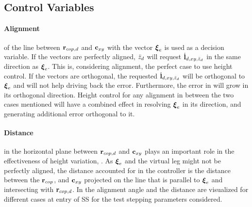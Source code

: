 \subsection{Control Variables}\label{sec:strategy}

%
\paragraph{Alignment} of the line between $\mathbf{r}_{cop,d}$ and $\mathbf{c}_{xy}$ with the vector $\boldsymbol{\xi}_e$ is used as a decision variable. If the vectors are perfectly aligned, $\ddot{z}_d$ will request $\dot{\mathbf{l}}_{d,xy,\ddot{z}_d}$ in the same direction as $\boldsymbol{\xi}_e$. This is, considering alignment, the perfect case to use height control. If the vectors are orthogonal, the requested $\dot{\mathbf{l}}_{d,xy,\ddot{z}_d}$ will be orthogonal to $\boldsymbol{\xi}_e$ and will not help driving back the error. Furthermore, the error in will grow in its orthogonal direction. Height control for any alignment in between the two cases mentioned will have a combined effect in resolving $\boldsymbol{\xi}_e$ in its direction, and generating additional error orthogonal to it.

\paragraph{Distance} in the horizontal plane between $\mathbf{r}_{cop,d}$ and $\mathbf{c}_{xy}$ plays an important role in the effectiveness of height variation, . As $\boldsymbol{\xi}_e$ and the virtual leg might not be perfectly aligned, the distance accounted for in the controller is the distance between the $\mathbf{r}_{cop}$, and $\mathbf{c}_{xy}$ projected on the line that is parallel to $\boldsymbol{\xi}_e$ and intersecting with $\mathbf{r}_{cop,d}$. In  the alignment angle and the distance are visualized for different cases at entry of \ac{SS} for the test stepping parameters considered.

